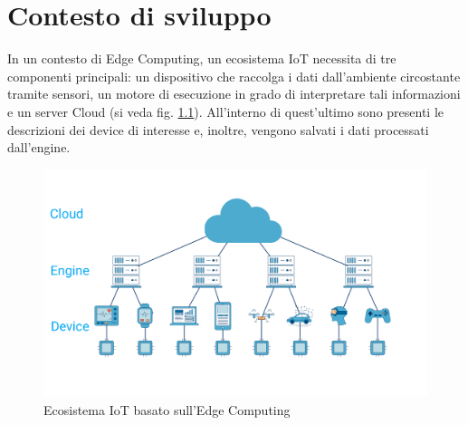 \chapter{Contesto di sviluppo}
In un contesto di Edge Computing, un ecosistema IoT necessita di tre componenti principali: un dispositivo che raccolga i dati dall'ambiente circostante tramite sensori, un motore di esecuzione in grado di interpretare tali informazioni e un server Cloud (si veda fig. \ref{ecosistema}). All'interno di quest'ultimo sono presenti le descrizioni dei device di interesse e, inoltre, vengono salvati i dati processati dall'engine.\\
\begin{figure}[H]
	\centering
	\includegraphics[width=\linewidth, height= 0.35 \textheight]{pics/edgecomputingstruct}
	\caption{Ecosistema IoT basato sull'Edge Computing}
	\label{ecosistema}
\end{figure}
\newpage
